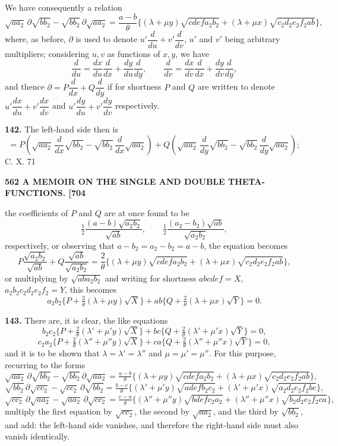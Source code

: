 \documentclass[11pt]{article}
\begin{document}
\medskip
We have consequently a relation
\[
\sqrt{aa_2}\,\partial\sqrt{bb_2} - \sqrt{bb_2}\,\partial\sqrt{aa_2} = \frac{a - b}{\theta}\bigl\{(\lambda + \mu y)\sqrt{cdefa_2b_2} + (\lambda + \mu x)\sqrt{c_2d_2e_2f_2ab}\bigr\},
\]
where, as before, $\partial$ is used to denote $u'\dfrac{d}{du} + v'\dfrac{d}{dv}$, $u'$ and $v'$ being arbitrary multipliers; considering $u, v$ as functions of $x, y$, we have
\[
\frac{d}{du} = \frac{dx}{du}\frac{d}{dx} + \frac{dy}{du}\frac{d}{dy},\qquad \frac{d}{dv} = \frac{dx}{dv}\frac{d}{dx} + \frac{dy}{dv}\frac{d}{dy},
\]
and thence $\partial = P\dfrac{d}{dx} + Q\dfrac{d}{dy}$ if for shortness $P$ and $Q$ are written to denote $u'\dfrac{dx}{du} + v'\dfrac{dx}{dv}$ and $u'\dfrac{dy}{du} + v'\dfrac{dy}{dv}$ respectively.

\medskip
\textbf{142.} The left-hand side then is
\[
= P\left(\sqrt{aa_2}\,\frac{d}{dx}\sqrt{bb_2} - \sqrt{bb_2}\,\frac{d}{dx}\sqrt{aa_2}\right) + Q\left(\sqrt{aa_2}\,\frac{d}{dy}\sqrt{bb_2} - \sqrt{bb_2}\,\frac{d}{dy}\sqrt{aa_2}\right);
\]
\hfill C. X. \hfill 71

\newpage
\noindent\textbf{562 \hfill A MEMOIR ON THE SINGLE AND DOUBLE THETA-FUNCTIONS. \hfill [704}

\medskip
the coefficients of $P$ and $Q$ are at once found to be
\[
\tfrac{1}{2}\frac{(a - b)\sqrt{a_2b_2}}{\sqrt{ab}},\qquad \tfrac{1}{2}\frac{(a_2 - b_2)\sqrt{ab}}{\sqrt{a_2b_2}},
\]
respectively, or observing that $a - b_2 = a_2 - b_2 = a - b$, the equation becomes
\[
P\frac{\sqrt{a_2b_2}}{\sqrt{ab}} + Q\frac{\sqrt{ab}}{\sqrt{a_2b_2}} = \frac{2}{\theta}\bigl\{(\lambda + \mu y)\sqrt{cdefa_2b_2} + (\lambda + \mu x)\sqrt{c_2d_2e_2f_2ab}\bigr\},
\]
or multiplying by $\sqrt{aba_2b_2}$ and writing for shortness $abcdef = X$, $a_2b_2c_2d_2e_2f_2 = Y$, this becomes
\[
a_2b_2\bigl\{P + \tfrac{2}{\theta}(\lambda + \mu y)\sqrt{X}\bigr\} + ab\bigl\{Q + \tfrac{2}{\theta}(\lambda + \mu x)\sqrt{Y}\bigr\} = 0.
\]

\medskip
\textbf{143.} There are, it is clear, the like equations
\[
b_2c_2\bigl\{P + \tfrac{2}{\theta}(\lambda' + \mu' y)\sqrt{X}\bigr\} + bc\bigl\{Q + \tfrac{2}{\theta}(\lambda' + \mu' x)\sqrt{Y}\bigr\} = 0,
\]
\[
c_2a_2\bigl\{P + \tfrac{2}{\theta}(\lambda'' + \mu'' y)\sqrt{X}\bigr\} + ca\bigl\{Q + \tfrac{2}{\theta}(\lambda'' + \mu'' x)\sqrt{Y}\bigr\} = 0,
\]
and it is to be shown that $\lambda = \lambda' = \lambda''$ and $\mu = \mu' = \mu''$. For this purpose, recurring to the forms
\[
\sqrt{aa_2}\,\partial\sqrt{bb_2} - \sqrt{bb_2}\,\partial\sqrt{aa_2} = \tfrac{a-b}{\theta}\bigl\{(\lambda + \mu y)\sqrt{cdefa_2b_2} + (\lambda + \mu x)\sqrt{c_2d_2e_2f_2ab}\bigr\},
\]
\[
\sqrt{bb_2}\,\partial\sqrt{cc_2} - \sqrt{cc_2}\,\partial\sqrt{bb_2} = \tfrac{b-c}{\theta}\bigl\{(\lambda' + \mu' y)\sqrt{adefb_2c_2} + (\lambda' + \mu' x)\sqrt{a_2d_2e_2f_2bc}\bigr\},
\]
\[
\sqrt{cc_2}\,\partial\sqrt{aa_2} - \sqrt{aa_2}\,\partial\sqrt{cc_2} = \tfrac{c-a}{\theta}\bigl\{(\lambda'' + \mu'' y)\sqrt{bdefc_2a_2} + (\lambda'' + \mu'' x)\sqrt{b_2d_2e_2f_2ca}\bigr\},
\]
multiply the first equation by $\sqrt{cc_2}$, the second by $\sqrt{aa_2}$, and the third by $\sqrt{bb_2}$, and add: the left-hand side vanishes, and therefore the right-hand side must also vanish identically.
\end{document}
